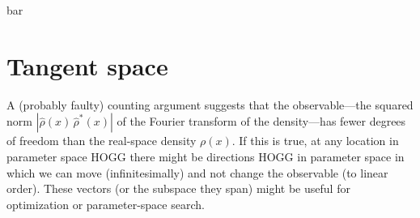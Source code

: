 \documentclass[12pt]{article}
\begin{document}
bar

\section{Tangent space}

A (probably faulty) counting argument suggests that the
observable---the squared norm $|\hat{\rho}(x)\,\hat{\rho}^{\ast}(x)|$
of the Fourier transform of the density---has fewer degrees of freedom
than the real-space density $\rho(x)$.
If this is true, at any location in parameter space HOGG there might
be directions HOGG in parameter space in which we can move
(infinitesimally) and not change the observable (to linear order).
These vectors (or the subspace they span) might be useful for
optimization or parameter-space search.
\end{document}
